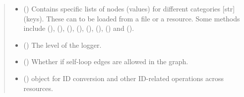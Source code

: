 \documentclass[letterpaper,10pt,english]{sphinxmanual}
\begin{document}
\begin{fulllineitems}
\begin{quote}
\begin{description}
\begin{itemize}
\item {} 
 () \textendash{} Contains specific lists of nodes (values) for different
categories {[}str{]} (keys). These can to be loaded from a file or
a resource. Some methods include
 (),
{\hyperref[\detokenize{reference:pypath.main.PyPath.druggability_list}]{}} (),
{\hyperref[\detokenize{reference:pypath.main.PyPath.kinases_list}]{}} (),
{\hyperref[\detokenize{reference:pypath.main.PyPath.tfs_list}]{}} (),
{\hyperref[\detokenize{reference:pypath.main.PyPath.disease_genes_list}]{}} (),
{\hyperref[\detokenize{reference:pypath.main.PyPath.signaling_proteins_list}]{}}
(), {\hyperref[\detokenize{reference:pypath.main.PyPath.proteome_list}]{}}
() and
{\hyperref[\detokenize{reference:pypath.main.PyPath.cancer_drivers_list}]{}} ().

\item {} 
 () \textendash{} The level of the logger.

\item {} 
 () \textendash{} Whether if self-loop edges are allowed in the graph.

\item {} 
 () \textendash{}  object for ID conversion and
other ID-related operations across resources.


\end{itemize}
\end{description}
\end{quote}
\end{fulllineitems}
\end{document}
